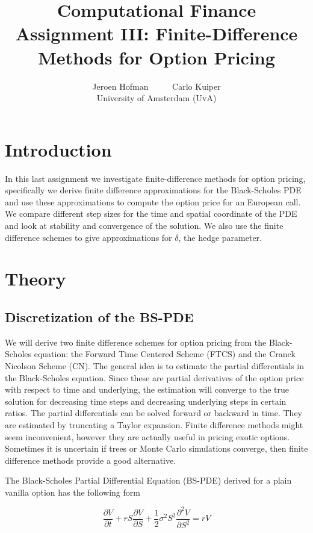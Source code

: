 \documentclass[11pt,a4paper]{article}
\author{Jeroen Hofman \ \ \ \ \ Carlo Kuiper\\
[15pt] University of Amsterdam (\textsc{UvA})}
\title{Computational Finance\\
Assignment III: Finite-Difference Methods for Option Pricing}
\begin{document}
\maketitle
\captionsetup{width=0.8\textwidth}
\thispagestyle{empty}

\newpage
\tableofcontents
\newpage

\section{Introduction}
In this last assignment we investigate finite-difference methods for option pricing, specifically we derive finite difference approximations for the Black-Scholes PDE and use these approximations to compute the option price for an European call. We compare different step sizes for the time and spatial coordinate of the PDE and look at stability and convergence of the solution. We also use the finite difference schemes to give approximations for $\delta$, the hedge parameter.

\section{Theory}

\subsection{Discretization of the BS-PDE}

We will derive two finite difference schemes for option pricing from the Black-Scholes equation: the Forward Time Centered Scheme (FTCS) and the Cranck Nicolson Scheme (CN).  The general idea is to estimate the partial differentials in the Black-Scholes equation. Since these are partial derivatives of the option price with respect to time and underlying, the estimation will converge to the true solution for decreasing time steps and decreasing underlying steps in certain ratios. The partial differentials can be solved forward or backward in time. They are estimated by truncating a Taylor expansion. Finite difference methods might seem inconvenient, however they are actually useful in pricing exotic options. Sometimes it is uncertain if trees or Monte Carlo simulations converge, then finite difference methods provide a good alternative.

The Black-Scholes Partial Differential Equation (BS-PDE) derived for a plain vanilla option has the following form

\begin{equation}
\frac{\partial V}{\partial t}+rS\frac{\partial V}{\partial S}+\frac{1}{2}\sigma^2S^2\frac{\partial^2V}{\partial S^2}=rV
\label{eq:BS-PDE}
\end{equation}
\end{document}
